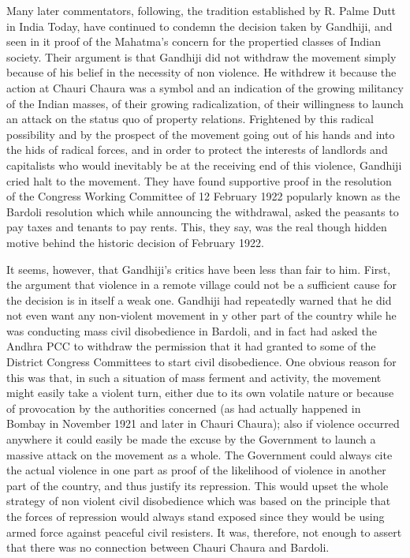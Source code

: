 Many later commentators, following, the tradition established by R. Palme Dutt in India Today, have continued to condemn the decision taken by Gandhiji, and seen in it proof of the Mahatma’s concern for the propertied classes of Indian society. Their argument is that Gandhiji did not withdraw the movement simply because of his belief in the necessity of non­ violence. He withdrew it because the action at Chauri Chaura was a symbol and an indication of the growing militancy of the Indian masses, of their growing radicalization, of their willingness to launch an attack on the status quo of property relations. Frightened by this radical possibility and by the prospect of the movement going out of his hands and into the hids of radical forces, and in order to protect the interests of landlords and capitalists who would inevitably be at the receiving end of this violence, Gandhiji cried halt to the movement. They have found supportive proof in the resolution of the Congress Working Committee of 12 February 1922 popularly known as the Bardoli resolution which while announcing the withdrawal, asked the peasants to pay taxes and tenants to pay rents. This, they say, was the real though hidden motive behind the historic decision of February 1922. 

It seems, however, that Gandhiji’s critics have been less than fair to him. First, the argument that violence in a remote village could not be a sufficient cause for the decision is in itself a weak one. Gandhiji had repeatedly warned that he did not even want any non-violent movement in y other part of the country while he was conducting mass civil disobedience in Bardoli, and in fact had asked the Andhra PCC to withdraw the permission that it had granted to some of the District Congress Committees to start civil disobedience. One obvious reason for this was that, in such a situation of mass ferment and activity, the movement might easily take a violent turn, either due to its own volatile nature or because of provocation by the authorities concerned (as had actually happened in Bombay in November 1921 and later in Chauri Chaura); also if violence occurred anywhere it could easily be made the excuse by the Government to launch a massive attack on the movement as a whole. The Government could always cite the actual violence in one part as proof of the likelihood of violence in another part of the country, and thus justify its repression. This would upset the whole strategy of non violent civil disobedience which was based on the principle that the forces of repression would always stand exposed since they would be using armed force against peaceful civil resisters. It was, therefore, not enough to assert that there was no connection between Chauri Chaura and Bardoli. 

